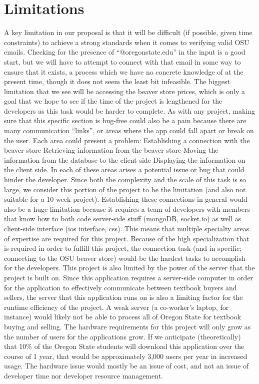 \documentclass[12pt]{article}
\begin{document}
\section{Limitations}
A key limitation in our proposal is that it will be difficult (if possible, given time constraints) to achieve a strong standards when it comes to verifying valid OSU emails. Checking for the presence of “@oregonstate.edu” in the input is a good start, but we will have to attempt to connect with that email in some way to ensure that it exists, a process which we have no concrete knowledge of at the present time, though it does not seem the least bit infeasible. The biggest limitation that we see will be accessing the beaver store prices, which is only a goal that we hope to see if the time of the project is lengthened for the developers as this task would be harder to complete. As with any project, making sure that this specific section is bug-free could also be a pain because there are many communication “links”, or areas where the app could fall apart or break on the user. Each area could present a problem:
Establishing a connection with the beaver store
Retrieving information from the beaver store
Moving the information from the database to the client side
Displaying the information on the client side.
In each of these areas arises a potential issue or bug that could hinder the developer. Since both the complexity and the scale of  this task is so large, we consider this portion of the project to be the limitation (and also not suitable for a 10 week project). Establishing these connections in general would also be a huge limitation because it requires a team of developers with members that know how to both code server-side stuff (mongoDB, socket.io) as well as client-side interface (ios interface, css). This means that multiple specialty areas of expertise are required for this project. Because of the high specialization that is required in order to fulfill this project, the connection task (and in specific; connecting to the OSU beaver store) would be the hardest tasks to accomplish for the developers. 
This project is also limited by the power of the server that the project is built on. Since this application requires a server-side computer in order for the application to effectively communicate between textbook buyers and sellers, the server that this application runs on is also a limiting factor for the runtime efficiency of the project. A weak server (a co-worker’s laptop, for instance) would likely not be able to process all of Oregon State for textbook buying and selling. The hardware requirements for this project will only grow as the number of users for the applications grow. If we anticipate (theoretically) that 10\% of the Oregon State students will download this application over the course of 1 year, that would be approximately 3,000 users per year in increased usage. The hardware issue would mostly be an issue of cost, and not an issue of developer time nor developer resource management.
\end{document}
